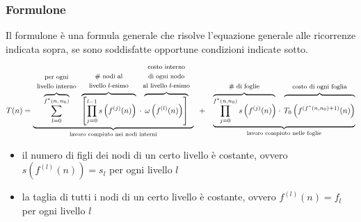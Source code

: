 \subsubsection*{Formulone}
Il formulone è una formula generale che risolve l'equazione generale alle ricorrenze indicata sopra, se sono soddisfatte
opportune condizioni indicate sotto.
\[
T(n) = \underbrace{
	\overbrace{\sum_{l=0}^{f^* (n, \, n_0)}}^{\begin{array}{c} \text{\footnotesize per ogni} \\ \text{\footnotesize livello interno} \end{array}}
	\overbrace{\left[ \prod_{j=0}^{l-1} s \left(f^{(j)}(n) \right) \right. \!}^{\begin{array}{c} \text{\footnotesize \# nodi al} \\ \text{\footnotesize livello \(l\)-esimo} \end{array}}
	\; \cdot \!\!\! \overbrace{\left. \phantom{\prod_{j}^{l} \!\!\!\!\!\!\!\!} \omega \left( f^{(l)}(n) \right) \right]}^{\begin{array}{c} \text{\footnotesize costo interno} \\ \text{\footnotesize di ogni nodo} \\ \text{\footnotesize al livello \(l\)-esimo} \end{array}}
	}_\text{lavoro compiuto nei nodi interni}
	\;\; + \;\;\;
	\underbrace{ \overbrace{\prod_{j=0}^{f^*(n, n_0)} s \left(f^{(j)}(n) \right) \!}^{\begin{array}{c} \text{\footnotesize \# di foglie} \end{array}}
	\; \cdot \; \overbrace{ \phantom{\prod_{j}^{f^*} \!\!\!\!\!\!\!\!} T_0 \left( f^{(f^*(n, n_0) + 1)}(n) \right)}^{\begin{array}{c} \text{\footnotesize costo di ogni foglia}\end{array}}
	}_\text{lavoro compiuto nelle foglie}
\]

\vspace{5pt}

\begin{itemize}
	\item il numero di figli dei nodi di un certo livello è costante, ovvero \(s(f^{(l)}(n)) = s_l\) per ogni livello \(l\)
	\item la taglia di tutti i nodi di un certo livello è costante, ovvero \(f^{(l)}(n) = f_l\) per ogni  livello \(l\)
\end{itemize}

